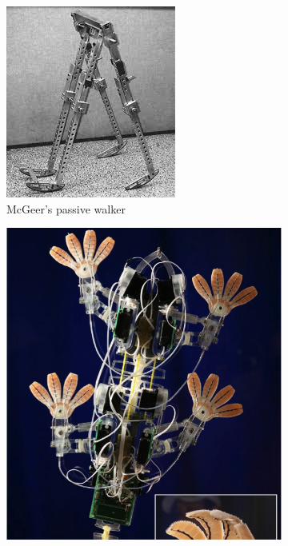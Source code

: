\begin{figure}[h]
	\centering
	\begin{subfigure}[b]{0.45\textwidth}
        \includegraphics[width=\textwidth]{figures/passive_walker.jpg}
        \caption{McGeer's passive walker}
        \label{fig:passive_walker}
    \end{subfigure}
    \begin{subfigure}[b]{0.45\textwidth}
        \includegraphics[width=\textwidth]{figures/Stickybot.jpg}

\end{subfigure}
\end{figure}
